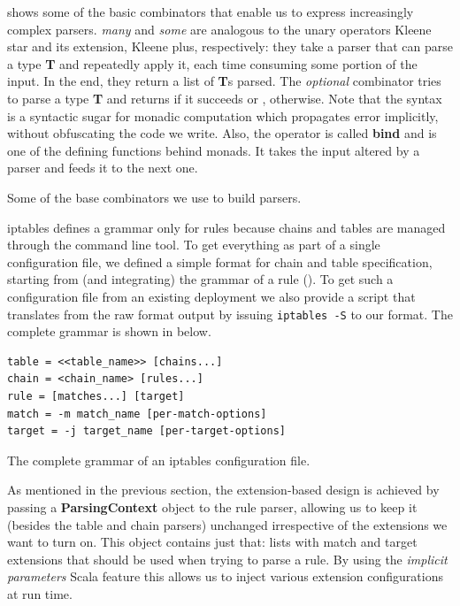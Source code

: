  shows some of the basic combinators
that enable us to express increasingly complex parsers.  \emph{many} and
\emph{some} are analogous to the unary operators Kleene star and its extension,
Kleene plus, respectively: they take a parser that can parse a type \textbf{T}
and repeatedly apply it, each time consuming some portion of the input.  In the
end, they return a list of \textbf{T}s parsed.  The \emph{optional} combinator
tries to parse a type \textbf{T} and returns  if it succeeds or
, otherwise.  Note that the  syntax is a
syntactic sugar for monadic computation which propagates error implicitly,
without obfuscating the code we write.  Also, the \hlmath{$>>=$} operator is
called \textbf{bind} and is one of the defining functions behind monads.  It
takes the input altered by a parser and feeds it to the next one.

\begin{listing}[H]
  \caption{Some of the base combinators we use to build parsers.}
  \label{lst:combinators}
\end{listing}

iptables defines a grammar only for rules because chains and tables are managed
through the command line tool.  To get everything as part of a single
configuration file, we defined a simple format for chain and table
specification, starting from (and integrating) the grammar of a rule
().  To get such a configuration file
from an existing deployment we also provide a script that translates from the
raw format output by issuing \texttt{iptables -S} to our format.  The complete
grammar is shown in  below.

\begin{listing}
  \small
  \lstset{numbers=none, frame=single, basicstyle=\ttfamily,
    xleftmargin=0.15\textwidth, xrightmargin=0.15\textwidth
  }
  \begin{lstlisting}
table = <<table_name>> [chains...]
chain = <chain_name> [rules...]
rule = [matches...] [target]
match = -m match_name [per-match-options]
target = -j target_name [per-target-options]
  \end{lstlisting}
  \caption{The complete grammar of an iptables configuration file.}
  \label{lst:our-grammar}
\end{listing}

As mentioned in the previous section, the extension-based design is achieved by
passing a \textbf{ParsingContext} object to the rule parser, allowing us to
keep it (besides the table and chain parsers) unchanged irrespective of the
extensions we want to turn on.  This object contains just that: lists with
match and target extensions that should be used when trying to parse a rule.
By using the \emph{implicit parameters} Scala feature this allows us to inject
various extension configurations at run time.

